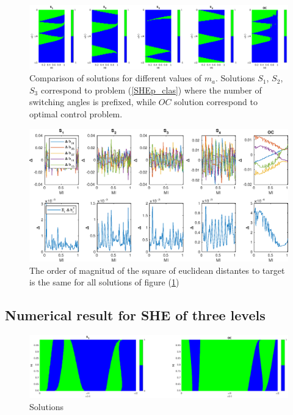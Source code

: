 \begin{figure}
        \centering
        \includegraphics[scale=0.35]{img/EX01_surf.eps}
        \caption{Comparison of solutions for different values of $m_a$. Solutions $S_1$, $S_2$, $S_3$ correspond to problem (\ref{SHEp_clas}) where the number of switching angles is prefixed, while $OC$ solution correspond to optimal control problem.}
        \label{fig:solutions}
    \end{figure}



\begin{figure}
    \centering
    \includegraphics[scale=0.7]{img/EX01.eps}
    \caption{The order of magnitud of the square of euclidean distantes to target is the same for all solutions of figure (\ref{fig:solutions})}
\end{figure}

\subsection{Numerical result for SHE of three levels}


\begin{figure}
    \centering
    \includegraphics[scale=0.35]{img/EX01_surf_3LVL.eps}
    \caption{Solutions}
\end{figure}



